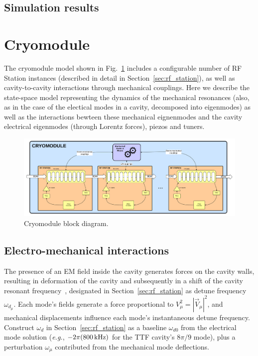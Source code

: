 \documentclass[a4paper,12pt]{article}
\begin{document}
\subsection{Simulation results}


\newpage

\section{Cryomodule}

The cryomodule model shown in Fig.~\ref{fig:Cryomodule_block_diagram} includes a configurable number of RF Station instances (described in detail in Section~\ref{sec:rf_station}), as well as cavity-to-cavity interactions through mechanical couplings. Here we describe the state-space model representing the dynamics of the mechanical resonances (also, as in the case of the electical modes in a cavity, decomposed into eigenmodes) as well as the interactions bewteen these mechanical eignenmodes and the cavity electrical eigenmodes (through Lorentz forces), piezos and tuners.

\begin{figure}
\centering
\includegraphics[scale=0.3]{../figures/Cryomodule_block_diagram.png}
\caption{Cryomodule block diagram.}
\label{fig:Cryomodule_block_diagram}
\end{figure}

\subsection{Electro-mechanical interactions}

The presence of an EM field inside the cavity generates forces on the cavity walls, resulting in deformation of the cavity and subsequently in a shift of the cavity resonant frequency~\cite{ref:delayen}, designated in Section~\ref{sec:rf_station} as detune frequency $\omega_{d_\mu}$. Each mode's fields generate a force proportional to $V_\mu^2 = |\vec V_\mu|^2$, and mechanical displacements influence each mode's instantaneous detune frequency.  Construct $\omega_d$ in Section~\ref{sec:rf_station} as a baseline $\omega_{d0}$ from the electrical mode solution ({\it e.g.}, $-2\pi (800\thinspace {\rm kHz})$ for the TTF cavity's $8\pi/9$ mode), plus a perturbation $\omega_{\mu}$ contributed from the mechanical mode deflections. 
\end{document}
